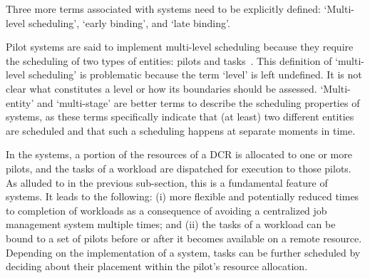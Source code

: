 \documentclass{sig-alternate}
\begin{document}
Three more terms associated with \pilot systems need to be explicitly defined:
`Multi-level scheduling', `early binding', and `late binding'.


 


Pilot systems are said to implement multi-level scheduling because they require
the scheduling of two types of entities: pilots and
tasks~\cite{rubio2015gwpilot,de2014panda,balderrama2012scalable}. This
definition of `multi-level scheduling' is problematic because the term `level'
is left undefined. It is not clear what constitutes a level or how its
boundaries should be assessed. `Multi-entity' and `multi-stage' are better terms
to describe the scheduling properties of \pilot systems, as these terms
specifically indicate that (at least) two different entities are scheduled and
that such a scheduling happens at separate moments in time.

In the \pilot systems, a portion of the resources of a DCR is allocated to one
or more pilots, and the tasks of a workload are dispatched for execution to
those pilots. As alluded to in the previous sub-section, this is a fundamental
feature of \pilot systems. It leads to the following: (i) more flexible and
potentially reduced times to completion of workloads as a consequence of
avoiding a centralized job management system multiple times; and (ii) the tasks
of a workload can be bound to a set of pilots before or after it becomes
available on a remote resource. Depending on the implementation of a \pilot
system, tasks can be further scheduled by deciding about their placement within
the pilot's resource allocation.
\end{document}
